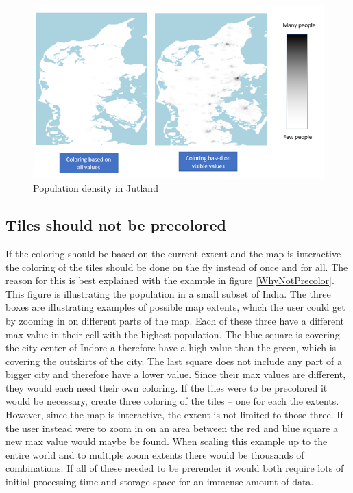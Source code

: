 \begin{figure} [H]
	\centering
	\includegraphics[width=.8\textwidth]{Pictures/WhyLimitToExtent}
	\caption{Population density in Jutland}
	\label{WhyLimitToExtent}
\end{figure}




\subsection{Tiles should not be precolored}
If the coloring should be based on the current extent and the map is interactive the coloring of the tiles should be done on the fly instead of once and for all. The reason for this is best explained with the example in figure \ref{WhyNotPrecolor}. This figure is illustrating the population in a small subset of India.  The three boxes are illustrating examples of possible map extents, which the user could get by zooming in on different parts of the map. Each of these three have a different max value in their cell with the highest population. The blue square is covering the city center of Indore a therefore have a high value than the green, which is covering the outskirts of the city. The last square does not include any part of a bigger city and therefore have a lower value. 
Since their max values are different, they would each need their own coloring. If the tiles were to be precolored it would be necessary, create three coloring of the tiles – one for each the extents. However, since the map is interactive, the extent is not limited to those three. If the user instead were to zoom in on an area between the red and blue square a new max value would maybe be found. When scaling this example up to the entire world and to multiple zoom extents there would be thousands of combinations. If all of these needed to be prerender it would both require lots of initial processing time and storage space for an immense amount of data. 


